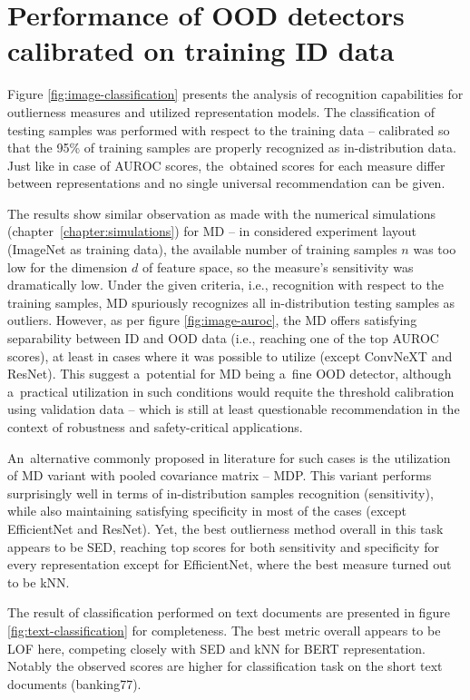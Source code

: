 \section{Performance of OOD detectors calibrated on training ID data}
\label{section:real-classification}

Figure \ref{fig:image-classification} presents the analysis of recognition capabilities for outlierness measures and utilized representation models. The classification of testing samples was performed with respect to the training data – calibrated so that the 95\% of training samples are properly recognized as in-distribution data. Just like in case of AUROC scores, the~obtained scores for each measure differ between representations and no single universal recommendation can be given.

The results show similar observation as made with the numerical simulations (chapter~\ref{chapter:simulations}) for MD – in considered experiment layout (ImageNet as training data), the available number of training samples $n$ was too low for the dimension $d$ of feature space, so the measure's sensitivity was dramatically low. Under the given criteria, i.e., recognition with respect to the training samples, MD spuriously recognizes all in-distribution testing samples as outliers. However, as per figure \ref{fig:image-auroc}, the MD offers satisfying separability between ID and OOD data (i.e., reaching one of the top AUROC scores), at least in cases where it was possible to utilize (except ConvNeXT and ResNet). This suggest a~potential for MD being a~fine OOD detector, although a~practical utilization in such conditions would requite the threshold calibration using validation data – which is still at least questionable recommendation in the context of robustness and safety-critical applications.

An~alternative commonly proposed in literature for such cases is the utilization of MD variant with pooled covariance matrix – MDP. This variant performs surprisingly well in terms of in-distribution samples recognition (sensitivity), while also maintaining satisfying specificity in most of the cases (except EfficientNet and ResNet). Yet, the best outlierness method overall in this task appears to be SED, reaching top scores for both sensitivity and specificity for every representation except for EfficientNet, where the best measure turned out to be kNN.

The result of classification performed on text documents are presented in figure \ref{fig:text-classification} for completeness. The best metric overall appears to be LOF here, competing closely with SED and kNN for BERT representation. Notably the observed scores are higher for classification task on the short text documents (banking77).

